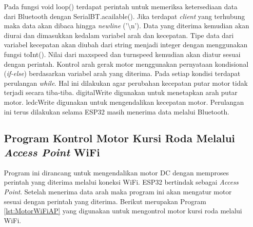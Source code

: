 Pada fungsi void loop() terdapat perintah untuk memeriksa ketersediaan data dari Bluetooth dengan SerialBT.acailable(). Jika terdapat \emph{client} yang terhubung maka data akan dibaca hingga \emph{newline} ('\textbackslash n'). Data yang diterima kemudian akan diurai dan dimasukkan kedalam variabel arah dan kecepatan. Tipe data dari variabel kecepatan akan diubah dari string menjadi integer dengan menggunakan fungsi toInt(). Nilai dari maxspeed dan turnspeed kemudian akan diatur sesuai dengan perintah. Kontrol arah gerak motor menggunakan pernyataan kondisional (\emph{if-else}) berdasarkan variabel arah yang diterima. Pada setiap kondisi terdapat perulangan \emph{while}. Hal ini dilakukan agar perubahan kecepatan putar motor tidak terjadi secara tiba-tiba. digitalWrite digunakan untuk menetapkan arah putar motor. ledcWrite digunakan untuk mengendalikan kecepatan motor. Perulangan ini terus dilakukan selama ESP32 masih menerima data melalui Bluetooth.

\subsection{Program Kontrol Motor Kursi Roda Melalui \emph{Access Point} WiFi}

Program ini dirancang untuk mengendalikan motor DC dengan memproses perintah yang diterima melalui koneksi WiFi. ESP32 bertindak sebagai \emph{Access Point}. Setelah menerima data arah maka program ini akan mengatur motor sesuai dengan perintah yang diterima. Berikut merupakan Program \ref{lst:MotorWiFiAP} yang digunakan untuk mengontrol motor kursi roda melalui WiFi.

